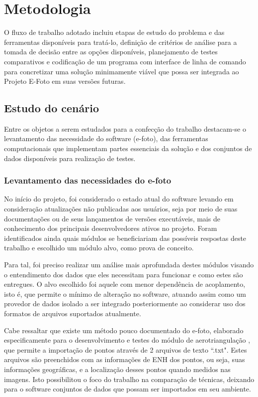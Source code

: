 \chapter{Metodologia} \label{chp:metod}

O fluxo de trabalho adotado incluiu etapas de estudo do problema e das ferramentas disponíveis para tratá-lo, definição de critérios de análise para a tomada de decisão entre as opções disponíveis, planejamento de testes comparativos e codificação de um programa com interface de linha de comando para concretizar uma solução minimamente viável que possa ser integrada ao Projeto E-Foto em suas versões futuras.

\section{Estudo do cenário}

Entre os objetos a serem estudados para a confecção do trabalho destacam-se o levantamento das necessidade do software (e-foto), das ferramentas computacionais que implementam partes essenciais da solução e dos conjuntos de dados disponíveis para realização de testes.

\subsection{Levantamento das necessidades do e-foto}

No início do projeto, foi considerado o estado atual do software levando em consideração atualizações não publicadas aos usuários, seja por meio de suas documentações ou de seus lançamentos de versões executáveis, mais de conhecimento dos principais desenvolvedores ativos no projeto. Foram identificados ainda quais módulos se beneficiariam das possíveis respostas deste trabalho e escolhido um módulo alvo, como prova de conceito. 

Para tal, foi preciso realizar um análise mais aprofundada destes módulos visando o entendimento dos dados que eles necessitam para funcionar e como estes são entregues. O alvo escolhido foi aquele com menor dependência de acoplamento, isto é, que permite o mínimo de alteração no software, atuando assim como um provedor de dados isolado a ser integrado posteriormente ao considerar uso dos formatos de arquivos suportados atualmente. 

Cabe ressaltar que existe um método pouco documentado do e-foto, elaborado especificamente para o desenvolvimento e testes do módulo de aerotriangulação \cite{pupim2012}, que permite a importação de pontos através de 2 arquivos de texto ``.txt". Estes arquivos são preenchidos com as informações de ENH dos pontos, ou seja, suas informações geográficas, e a localização desses pontos quando medidos nas imagens. Isto possibilitou o foco do trabalho na comparação de técnicas, deixando para o software conjuntos de dados que possam ser importados em seu ambiente.

